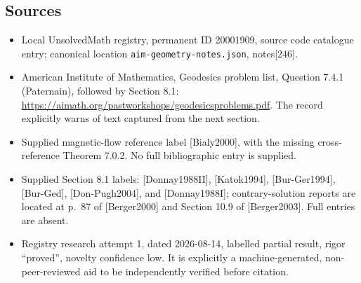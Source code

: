 \documentclass[11pt]{article}
\begin{document}
\subsection{Sources}
\begin{itemize}
\item Local UnsolvedMath registry, permanent ID 20001909, source code catalogue entry; canonical location \texttt{aim-geometry-notes.json}, notes[246].
\item American Institute of Mathematics, Geodesics problem list, Question 7.4.1 (Paternain), followed by Section 8.1: \url{https://aimath.org/pastworkshops/geodesicsproblems.pdf}. The record explicitly warns of text captured from the next section.
\item Supplied magnetic-flow reference label [Bialy2000], with the missing cross-reference Theorem 7.0.2. No full bibliographic entry is supplied.
\item Supplied Section 8.1 labels: [Donnay1988II], [Katok1994], [Bur-Ger1994], [Bur-Ged], [Don-Pugh2004], and [Donnay1988I]; contrary-solution reports are located at p.~87 of [Berger2000] and Section 10.9 of [Berger2003]. Full entries are absent.
\item Registry research attempt 1, dated 2026-08-14, labelled partial result, rigor ``proved'', novelty confidence low. It is explicitly a machine-generated, non-peer-reviewed aid to be independently verified before citation.
\end{itemize}
\end{document}
